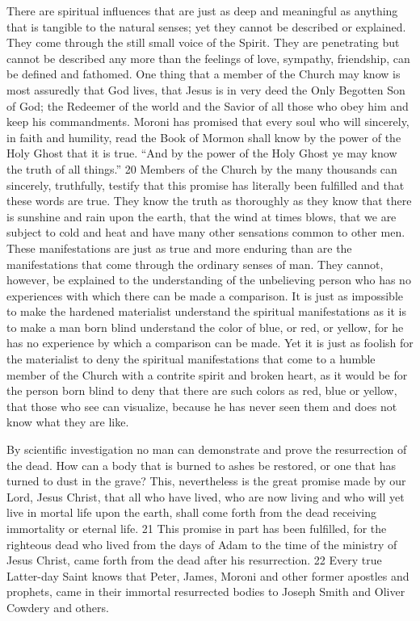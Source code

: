 There are spiritual influences that are just as deep and meaningful as anything that is tangible
to the natural senses; yet they cannot be described or explained. They come through the still
small voice of the Spirit. They are penetrating but cannot be described any more than the
feelings of love, sympathy, friendship, can be defined and fathomed. One thing that a
member of the Church may know is most assuredly that God lives, that Jesus is in very deed
the Only Begotten Son of God; the Redeemer of the world and the Savior of all those who
obey him and keep his commandments. Moroni has promised that every soul who will
sincerely, in faith and humility, read the Book of Mormon shall know by the power of the
Holy Ghost that it is true. ``And by the power of the Holy Ghost ye may know the truth of all
things.'' 20 Members of the Church by the many thousands can sincerely, truthfully, testify
that this promise has literally been fulfilled and that these words are true. They know the
truth as thoroughly as they know that there is sunshine and rain upon the earth, that the wind
at times blows, that we are subject to cold and heat and have many other sensations common
to other men. These manifestations are just as true and more enduring than are the
manifestations that come through the ordinary senses of man. They cannot, however, be
explained to the understanding of the unbelieving person who has no experiences with which
there can be made a comparison. It is just as impossible to make the hardened materialist
understand the spiritual manifestations as it is to make a man born blind understand the color
of blue, or red, or yellow, for he has no experience by which a comparison can be made. Yet
it is just as foolish for the materialist to deny the spiritual manifestations that come to a
humble member of the Church with a contrite spirit and broken heart, as it would be for the
person born blind to deny that there are such colors as red, blue or yellow, that those who see
can visualize, because he has never seen them and does not know what they are like.

By scientific investigation no man can demonstrate and prove the resurrection of the dead.
How can a body that is burned to ashes be restored, or one that has turned to dust in the
grave? This, nevertheless is the great promise made by our Lord, Jesus Christ, that all who
have lived, who are now living and who will yet live in mortal life upon the earth, shall come
forth from the dead receiving immortality or eternal life. 21 This promise in part has been
fulfilled, for the righteous dead who lived from the days of Adam to the time of the ministry
of Jesus Christ, came forth from the dead after his resurrection. 22 Every true Latter-day
Saint knows that Peter, James, Moroni and other former apostles and prophets, came in their
immortal resurrected bodies to Joseph Smith and Oliver Cowdery and others.

